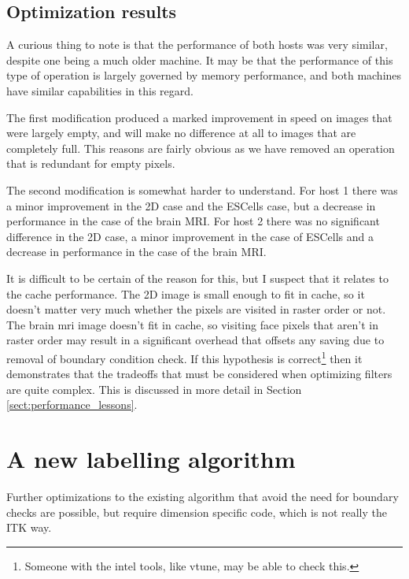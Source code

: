 \documentclass{InsightArticle}
\begin{document}
\subsection{Optimization results}
A curious thing to note is that the performance of both hosts was very
similar, despite one being a much older machine. It may be that the
performance of this type of operation is largely governed by memory
performance, and both machines have similar capabilities in this
regard.

The first modification produced a marked improvement in speed on
images that were largely empty, and will make no difference at all to
images that are completely full. This reasons are fairly obvious as we
have removed an operation that is redundant for empty pixels.

The second modification is somewhat harder to understand. For host 1
there was a minor improvement in the 2D case and the ESCells case, but
a decrease in performance in the case of the brain MRI. For host 2
there was no significant difference in the 2D case, a minor
improvement in the case of ESCells and a decrease in performance in
the case of the brain MRI.

It is difficult to be certain of the reason for this, but I suspect
that it relates to the cache performance. The 2D image is small enough
to fit in cache, so it doesn't matter very much whether the pixels are
visited in raster order or not. The brain mri image doesn't fit in
cache, so visiting face pixels that aren't in raster order may result
in a significant overhead that offsets any saving due to removal of
boundary condition check. If this hypothesis is
correct\footnote{Someone with the intel tools, like vtune, may be able
to check this.} then it demonstrates that the tradeoffs that must be
considered when optimizing filters are quite complex. This is
discussed in more detail in Section \ref{sect:performance_lessons}.

\section{A new labelling algorithm}
Further optimizations to the existing algorithm that avoid the need
for boundary checks are possible, but require dimension specific code,
which is not really the ITK way.
\end{document}
